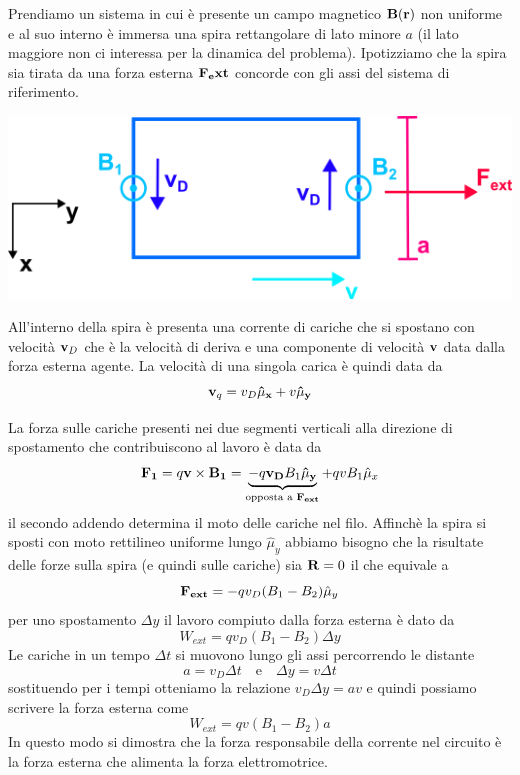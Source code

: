 Prendiamo un sistema in cui \`e presente un campo magnetico $\bold{B}(\bold{r})$ non uniforme e al suo interno \`e  immersa una spira rettangolare di lato minore $a$ (il lato maggiore non ci interessa per la dinamica del problema). Ipotizziamo che la spira sia tirata da una forza esterna $\bold{F_ext}$ concorde con gli assi del 
sistema di riferimento. 
\begin{center}
	\includegraphics[width = 0.6 \textwidth]{images/lavoro.png}
\end{center}
All'interno della spira \`e presenta una corrente di cariche che si spostano con velocit\`a $\bold{v}_D$ che \`e la velocit\`a di deriva e una componente di velocit\`a $\bold{v}$ data dalla forza esterna agente. La velocit\`a di una singola carica \`e quindi data da
\begin{equation*}
	\bold{v}_q =  v_D \bold{\hat{\mu}_x}  + v \bold{\hat{\mu}_y}
\end{equation*}

La forza sulle cariche presenti nei due segmenti verticali alla direzione di spostamento che contribuiscono al lavoro \`e data da 
\begin{equation*}
	\bold{F_1} = q \bold{v} \times \bold{B_1} = \underbrace{-q \bold{v_D}B_1 \bold{\hat{\mu}_y}}_{\text{opposta a } \bold{F_{ext}} } + qvB_1 \hat{\mu}_x
\end{equation*}
il secondo addendo determina il moto delle cariche nel filo. Affinch\`e la spira si sposti con moto rettilineo uniforme lungo $\hat{\mu}_y$ abbiamo bisogno che la risultate delle forze sulla spira (e quindi sulle cariche) sia $\bold{R} = 0$ il che equivale a 
\begin{equation*}
	\bold{F_{ext}} = -q v_D(B_1-B_2)\hat{\mu}_y
\end{equation*}
per uno spostamento $\Delta y$ il lavoro compiuto dalla forza esterna \`e dato da 
\begin{equation*}
	W_{ext} =qv_D(B_1-B_2)\Delta y
\end{equation*}
Le cariche in un tempo $\Delta t$ si muovono lungo gli assi percorrendo le distante 
\begin{equation*}
a = v_D \Delta t \quad \text{e} \quad \Delta y = v \Delta t
\end{equation*} 
sostituendo per i tempi otteniamo la relazione $v_D \Delta y = a v$ e quindi possiamo scrivere la forza esterna come 
\begin{equation*}
	W_{ext} = q v(B_1-B_2)a
\end{equation*}
In questo modo si dimostra che la forza responsabile della corrente nel circuito \`e la forza esterna che alimenta la forza elettromotrice.

